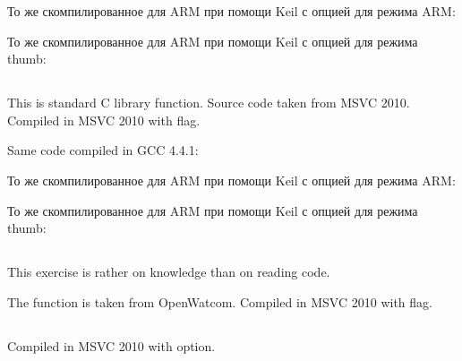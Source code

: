 

То же скомпилированное для ARM при помощи Keil с опцией \Othree для режима ARM:



То же скомпилированное для ARM при помощи Keil с опцией \Othree для режима thumb:



\subsection{}

{This is standard C library function. Source code taken from MSVC 2010. Compiled in MSVC 2010 with \Ox flag.}



{Same code compiled in GCC 4.4.1}:



То же скомпилированное для ARM при помощи Keil с опцией \Othree для режима ARM:



То же скомпилированное для ARM при помощи Keil с опцией \Othree для режима thumb:



\subsection{}

{This exercise is rather on knowledge than on reading code.}

{The function is taken from OpenWatcom. Compiled in MSVC 2010 with \Ox flag.}



\subsection{}

{Compiled in MSVC 2010 with \Ox option.}


